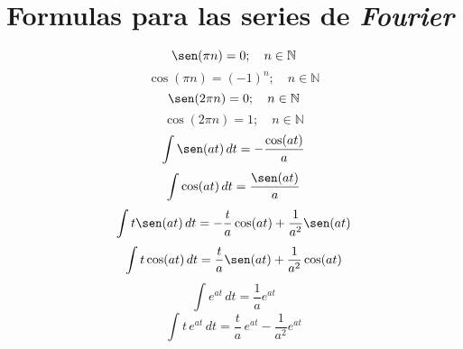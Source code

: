 \section{Formulas para las series de \emph{Fourier}}
\begin{equation*}
    \sen(\pi n)=0;\quad n\in\mathbb{N}
\end{equation*}
\begin{equation*}
    \cos(\pi n)={(-1)}^n;\quad n\in\mathbb{N}
\end{equation*}
\begin{equation*}
    \sen(2\pi n)=0;\quad n\in\mathbb{N}
\end{equation*}
\begin{equation*}
    \cos(2\pi n)=1;\quad n\in\mathbb{N}
\end{equation*}
\begin{equation*}
    \int \sen(at)\,dt=-\frac{\cos(at)}{a}
\end{equation*}
\begin{equation*}
    \int \cos(at)\,dt=\frac{\sen(at)}{a}
\end{equation*}
\begin{equation*}
    \int t\sen(at)\,dt=-\frac{t}{a}\cos(at)+\frac{1}{a^2}\sen(at)
\end{equation*}
\begin{equation*}
    \int t\cos(at)\,dt=\frac{t}{a}\sen(at)+\frac{1}{a^2}\cos(at)
\end{equation*}
\begin{equation*}
    \int {e}^{at}\,dt=\frac{1}{a}e^{at}
\end{equation*}
\begin{equation*}
    \int t\,{e}^{at}\,dt=\frac{t}{a}\,{e}^{at}-\frac{1}{a^2}{e}^{at}
\end{equation*}

